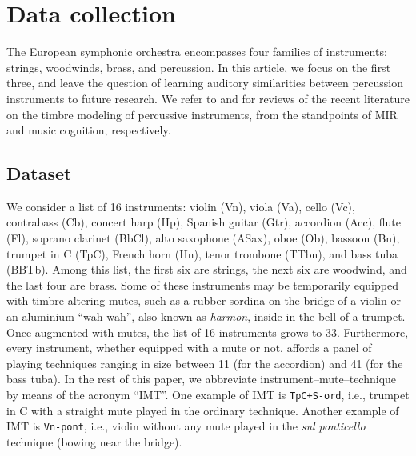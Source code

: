 \documentclass{bmcart}
\makeatletter
\newcommand*{\ie}{i.e.,\@\xspace}
\newcommand{\nmu}{}
\makeatother
\begin{document}
\section*{\nmu Data collection}
\label{sec:data-collection}

The European symphonic orchestra encompasses four families of instruments: strings, woodwinds, brass, and percussion.
In this article, we focus on the first three, and leave the question of learning auditory similarities between percussion instruments to future research.
We refer to \cite{wu2018taslp} and \cite{pearce2019appliedsciences} for reviews of the recent literature on the timbre modeling of percussive instruments, from the standpoints of MIR and music cognition, respectively.

\subsection*{Dataset}
We consider a list of 16 instruments: violin (Vn), viola (Va), cello (Vc), contrabass (Cb), concert harp (Hp), Spanish guitar (Gtr), accordion (Acc), flute (Fl), soprano clarinet (BbCl), alto saxophone (ASax), oboe (Ob), bassoon (Bn), trumpet in C (TpC), French horn (Hn), tenor trombone (TTbn), and bass tuba (BBTb).
Among this list, the first six are strings, the next six are woodwind, and the last four are brass.
Some of these instruments may be temporarily equipped with timbre-altering mutes, such as a rubber sordina on the bridge of a violin or an aluminium ``wah-wah'', also known as \emph{harmon}, inside in the bell of a trumpet.
Once augmented with mutes, the list of 16 instruments grows to 33.
Furthermore, every instrument, whether equipped with a mute or not, affords a panel of playing techniques ranging in size between 11 (for the accordion) and 41 (for the bass tuba).
In the rest of this paper, we abbreviate instrument--mute--technique by means of the acronym ``IMT''.
One example of IMT is \texttt{TpC+S-ord}, \ie{} trumpet in C with a straight mute played in the ordinary technique.
Another example of IMT is \texttt{Vn-pont}, \ie{} violin without any mute played in the \emph{sul ponticello} technique (bowing near the bridge).
\end{document}
